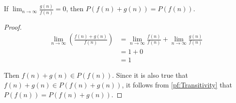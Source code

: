 \begin{theorem}
	If $\lim_{n \to \infty} \frac{g(n)}{f(n)} = 0$, then $P(f(n) + g(n)) = P(f(n))$.
\end{theorem}

\begin{proof}
	\begin{align*}
	\lim_{n \to \infty} \left( \frac{f(n) + g(n)}{f(n)} \right) &= \lim_{n \to \infty} \frac{f(n)}{f(n)} + \lim_{n \to \infty} \frac{g(n)}{f(n)}\\
	&= 1 + 0\\
	&= 1
	\end{align*}
	
	Then $f(n) + g(n) \in P(f(n))$. Since it is also true that $f(n) + g(n) \in P(f(n) + g(n))$, it follows from \ref{pf:Transitivity} that $P(f(n)) = P(f(n) + g(n))$.
\end{proof}